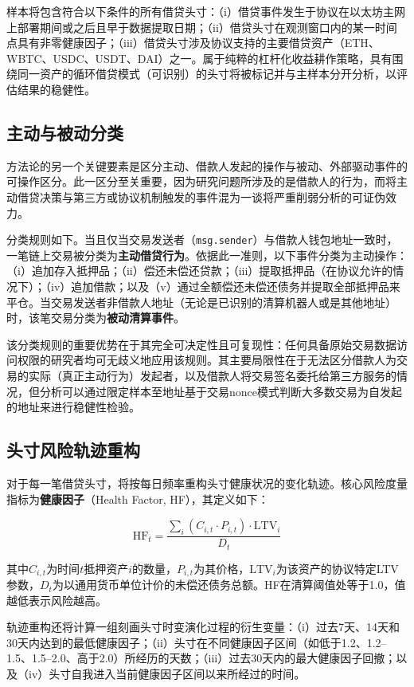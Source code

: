 样本将包含符合以下条件的所有借贷头寸：（i）借贷事件发生于协议在以太坊主网上部署期间或之后且早于数据提取日期；（ii）借贷头寸在观测窗口内的某一时间点具有非零健康因子；（iii）借贷头寸涉及协议支持的主要借贷资产（ETH、WBTC、USDC、USDT、DAI）之一。属于纯粹的杠杆化收益耕作策略，具有围绕同一资产的循环借贷模式（可识别）的头寸将被标记并与主样本分开分析，以评估结果的稳健性。

\subsection{主动与被动分类}

方法论的另一个关键要素是区分主动、借款人发起的操作与被动、外部驱动事件的可操作区分。此一区分至关重要，因为研究问题所涉及的是借款人的行为，而将主动借贷决策与第三方或协议机制触发的事件混为一谈将严重削弱分析的可证伪效力。

分类规则如下。当且仅当交易发送者（\texttt{msg.sender}）与借款人钱包地址一致时，一笔链上交易被分类为\textbf{主动借贷行为}。依据此一准则，以下事件分类为主动操作：（i）追加存入抵押品；（ii）偿还未偿还贷款；（iii）提取抵押品（在协议允许的情况下）；（iv）追加借款；以及（v）通过全额偿还未偿还债务并提取全部抵押品来平仓。当交易发送者非借款人地址（无论是已识别的清算机器人或是其他地址）时，该笔交易分类为\textbf{被动清算事件}。

该分类规则的重要优势在于其完全可决定性且可复现性：任何具备原始交易数据访问权限的研究者均可无歧义地应用该规则。其主要局限性在于无法区分借款人为交易的实际（真正主动行为）发起者，以及借款人将交易签名委托给第三方服务的情况，但分析可以通过限定样本至地址基于交易nonce模式判断大多数交易为自发起的地址来进行稳健性检验。

\subsection{头寸风险轨迹重构}

对于每一笔借贷头寸，将按每日频率重构头寸健康状况的变化轨迹。核心风险度量指标为\textbf{健康因子}（Health Factor, HF），其定义如下：

\begin{equation}
\text{HF}_t = \frac{\sum_{i} (C_{i,t} \cdot P_{i,t}) \cdot \text{LTV}_i}{D_t}
\end{equation}

其中\(C_{i,t}\)为时间\(t\)抵押资产\(i\)的数量，\(P_{i,t}\)为其价格，\(\text{LTV}_i\)为该资产的协议特定LTV参数，\(D_t\)为以通用货币单位计价的未偿还债务总额。HF在清算阈值处等于1.0，值越低表示风险越高。

轨迹重构还将计算一组刻画头寸时变演化过程的衍生变量：（i）过去7天、14天和30天内达到的最低健康因子；（ii）头寸在不同健康因子区间（如低于1.2、1.2--1.5、1.5--2.0、高于2.0）所经历的天数；（iii）过去30天内的最大健康因子回撤；以及（iv）头寸自我进入当前健康因子区间以来所经过的时间。

